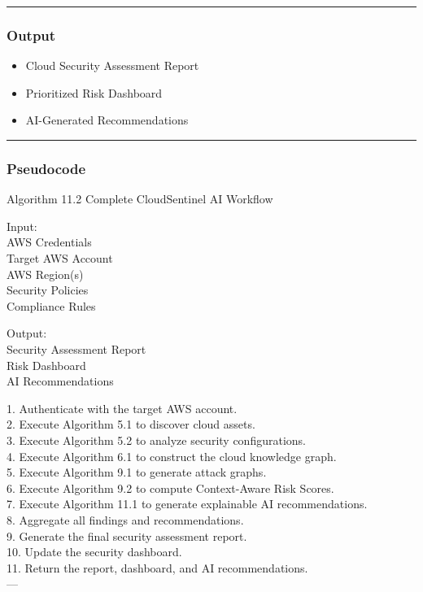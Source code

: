 \begin{center}\rule{0.5\linewidth}{0.5pt}\end{center}

\subsubsection{\texorpdfstring{\textbf{Output}}{Output}}

\begin{itemize}
\tightlist
\item
  Cloud Security Assessment Report\\
\item
  Prioritized Risk Dashboard\\
\item
  AI-Generated Recommendations
\end{itemize}

\begin{center}\rule{0.5\linewidth}{0.5pt}\end{center}

\subsubsection{Pseudocode}

Algorithm 11.2 Complete CloudSentinel AI Workflow

Input:\\
AWS Credentials\\
Target AWS Account\\
AWS Region(s)\\
Security Policies\\
Compliance Rules

Output:\\
Security Assessment Report\\
Risk Dashboard\\
AI Recommendations

1. Authenticate with the target AWS account.\\
2. Execute Algorithm 5.1 to discover cloud assets.\\
3. Execute Algorithm 5.2 to analyze security configurations.\\
4. Execute Algorithm 6.1 to construct the cloud knowledge graph.\\
5. Execute Algorithm 9.1 to generate attack graphs.\\
6. Execute Algorithm 9.2 to compute Context-Aware Risk Scores.\\
7. Execute Algorithm 11.1 to generate explainable AI recommendations.\\
8. Aggregate all findings and recommendations.\\
9. Generate the final security assessment report.\\
10. Update the security dashboard.\\
11. Return the report, dashboard, and AI recommendations.\\
---

